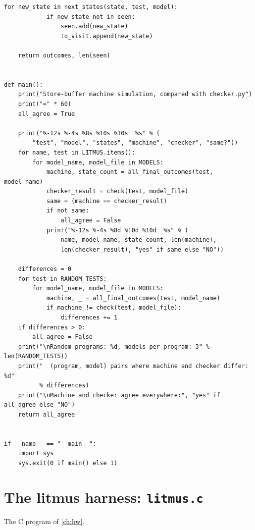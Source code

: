 \begin{lstlisting}[style=vspython]
        for new_state in next_states(state, test, model):
            if new_state not in seen:
                seen.add(new_state)
                to_visit.append(new_state)

    return outcomes, len(seen)


def main():
    print("Store-buffer machine simulation, compared with checker.py")
    print("=" * 60)
    all_agree = True

    print("%-12s %-4s %8s %10s %10s  %s" % (
        "test", "model", "states", "machine", "checker", "same?"))
    for name, test in LITMUS.items():
        for model_name, model_file in MODELS:
            machine, state_count = all_final_outcomes(test, model_name)
            checker_result = check(test, model_file)
            same = (machine == checker_result)
            if not same:
                all_agree = False
            print("%-12s %-4s %8d %10d %10d  %s" % (
                name, model_name, state_count, len(machine),
                len(checker_result), "yes" if same else "NO"))

    differences = 0
    for test in RANDOM_TESTS:
        for model_name, model_file in MODELS:
            machine, _ = all_final_outcomes(test, model_name)
            if machine != check(test, model_file):
                differences += 1
    if differences > 0:
        all_agree = False
    print("\nRandom programs: %d, models per program: 3" % len(RANDOM_TESTS))
    print("  (program, model) pairs where machine and checker differ: %d"
          % differences)
    print("\nMachine and checker agree everywhere:", "yes" if all_agree else "NO")
    return all_agree


if __name__ == "__main__":
    import sys
    sys.exit(0 if main() else 1)
\end{lstlisting}

\section{The litmus harness: \texttt{litmus.c}}
The C program of \cref{ch:hw}.

